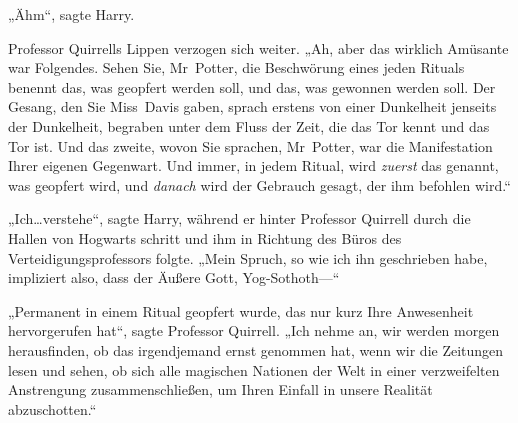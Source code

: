 „Ähm“, sagte Harry.

Professor Quirrells Lippen verzogen sich weiter. „Ah, aber das wirklich Amüsante war Folgendes. Sehen Sie, Mr~Potter, die Beschwörung eines jeden Rituals benennt das, was geopfert werden soll, und das, was gewonnen werden soll. Der Gesang, den Sie Miss~Davis gaben, sprach erstens von einer Dunkelheit jenseits der Dunkelheit, begraben unter dem Fluss der Zeit, die das Tor kennt und das Tor ist. Und das zweite, wovon Sie sprachen, Mr~Potter, war die Manifestation Ihrer eigenen Gegenwart. Und immer, in jedem Ritual, wird \emph{zuerst} das genannt, was geopfert wird, und \emph{danach} wird der Gebrauch gesagt, der ihm befohlen wird.“

„Ich…verstehe“, sagte Harry, während er hinter Professor Quirrell durch die Hallen von Hogwarts schritt und ihm in Richtung des Büros des Verteidigungsprofessors folgte. „Mein Spruch, so wie ich ihn geschrieben habe, impliziert also, dass der Äußere Gott, Yog-Sothoth—“

„Permanent in einem Ritual geopfert wurde, das nur kurz Ihre Anwesenheit hervorgerufen hat“, sagte Professor Quirrell. „Ich nehme an, wir werden morgen herausfinden, ob das irgendjemand ernst genommen hat, wenn wir die Zeitungen lesen und sehen, ob sich alle magischen Nationen der Welt in einer verzweifelten Anstrengung zusammenschließen, um Ihren Einfall in unsere Realität abzuschotten.“

